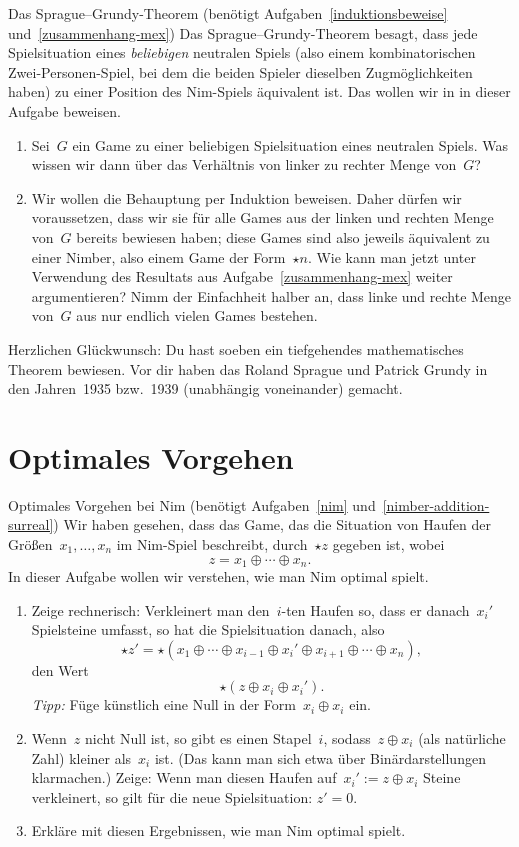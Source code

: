 \documentclass{../zirkelblatt}
\newcommand{\head}[1]{\section*{\rmfamily #1}}%
\begin{document}
\begin{aufgabe}{Das Sprague--Grundy-Theorem
(benötigt Aufgaben~\ref{induktionsbeweise} und~\ref{zusammenhang-mex})}
\label{sprague-grundy}
Das Sprague--Grundy-Theorem besagt, dass jede Spielsituation eines
\emph{beliebigen} neutralen Spiels (also einem
kombinatorischen Zwei-Personen-Spiel, bei dem die beiden Spieler dieselben
Zugmöglichkeiten haben) zu einer Position des Nim-Spiels äquivalent ist. Das
wollen wir in in dieser Aufgabe beweisen.
\begin{enumerate}
\item Sei~$G$ ein Game zu einer beliebigen Spielsituation eines neutralen
Spiels. Was wissen wir dann über das Verhältnis von linker zu rechter Menge
von~$G$?
\item Wir wollen die Behauptung per Induktion beweisen. Daher dürfen wir
voraussetzen, dass wir sie für alle Games aus der linken und rechten Menge
von~$G$ bereits bewiesen haben; diese Games sind also jeweils äquivalent zu
einer Nimber, also einem Game der Form~$\star n$. Wie kann man jetzt unter
Verwendung des Resultats aus Aufgabe~\ref{zusammenhang-mex} weiter argumentieren?
Nimm der Einfachheit halber an, dass linke und rechte Menge von~$G$ aus nur
endlich vielen Games bestehen.
\end{enumerate}
Herzlichen Glückwunsch: Du hast soeben ein tiefgehendes mathematisches
Theorem bewiesen. Vor dir haben das Roland Sprague und Patrick Grundy in den
Jahren~1935 bzw.~1939 (unabhängig voneinander) gemacht.
\end{aufgabe}


\head{Optimales Vorgehen}

\begin{aufgabe}{Optimales Vorgehen bei Nim
(benötigt Aufgaben~\ref{nim} und~\ref{nimber-addition-surreal})}
\label{nim-optimal}
Wir haben gesehen, dass das Game, das die Situation von Haufen der
Größen~$x_1,\ldots,x_n$ im Nim-Spiel beschreibt, durch~$\star z$ gegeben ist,
wobei
\[ z = x_1 \oplus \cdots \oplus x_n. \]
In dieser Aufgabe wollen wir verstehen, wie man Nim optimal
spielt.
\begin{enumerate}
\item Zeige rechnerisch: Verkleinert man den~$i$-ten Haufen so, dass er
danach~$x_i'$ Spielsteine umfasst, so hat die Spielsituation danach, also
\[ \star z' = \star(x_1 \oplus \cdots \oplus x_{i-1} \oplus x_i' \oplus x_{i+1} \oplus
\cdots \oplus x_n), \]
den Wert
\[ \star(z \oplus x_i \oplus x_i'). \]
\emph{Tipp:} Füge künstlich eine Null in der Form~$x_i \oplus x_i$ ein.
\item Wenn~$z$ nicht Null ist, so gibt es einen Stapel~$i$, sodass~$z \oplus
x_i$ (als natürliche Zahl) kleiner als~$x_i$ ist. (Das kann man sich etwa über
Binärdarstellungen klarmachen.) Zeige: Wenn man diesen Haufen auf~$x_i' :=
z \oplus x_i$ Steine verkleinert, so gilt für die neue Spielsituation: $z' =
0$.
\item Erkläre mit diesen Ergebnissen, wie man Nim optimal spielt.
\end{enumerate}
\end{aufgabe}
\end{document}
